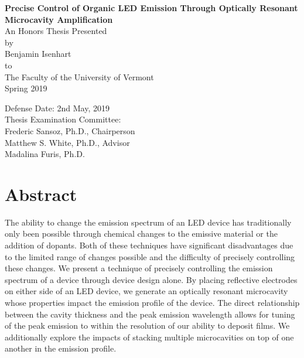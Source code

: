 \documentclass{report}
\author{Benjamin Isenhart}
\begin{document}
\begin{titlepage}
	\begin{center}
		\vspace{1cm}
		\Huge
		\textbf{Precise Control of Organic LED Emission Through Optically Resonant Microcavity Amplification}\\
		\vspace{1.5cm}
		\Large
		An Honors Thesis Presented\\
		by\\
		Benjamin Isenhart\\
		to\\
		The Faculty of the University of Vermont\\
		\vspace{0.5cm}
		Spring 2019
		\vspace{2cm}
	\end{center}
	\begin{flushright}
		\Large
		Defense Date: 2nd May, 2019\\
		Thesis Examination Committee:\\
		\vspace{0.5cm}
		Frederic Sansoz, Ph.D., Chairperson\\
		Matthew S. White, Ph.D., Advisor\\
		Madalina Furis, Ph.D.\\
	\end{flushright}
\end{titlepage}

\chapter*{Abstract} \label{abstract}
The ability to change the emission spectrum of an LED device has traditionally only been possible through chemical changes to the emissive material or the addition of dopants. Both of these techniques have significant disadvantages due to the limited range of changes possible and the difficulty of precisely controlling these changes. We present a technique of precisely controlling the emission spectrum of a device through device design alone. By placing reflective electrodes on either side of an LED device, we generate an optically resonant microcavity whose properties impact the emission profile of the device. The direct relationship between the cavity thickness and the peak emission wavelength allows for tuning of the peak emission to within the resolution of our ability to deposit films. We additionally explore the impacts of stacking multiple microcavities on top of one another in the emission profile.
\end{document}
